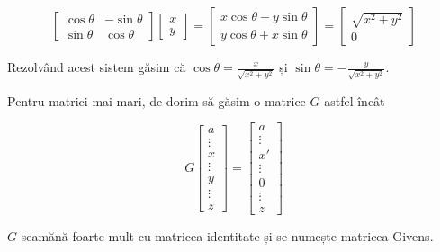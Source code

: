 \documentclass{exam}
\begin{document}
\begin{equation*}
	\begin{bmatrix} \cos \theta & -\sin \theta \\ \sin \theta & \cos \theta \end{bmatrix} \begin{bmatrix} x \\ y \end{bmatrix}
	= \begin{bmatrix} x \cos \theta - y \sin \theta \\ y \cos \theta + x \sin \theta \end{bmatrix}
	= \begin{bmatrix} \sqrt{x^2 + y^2} \\ 0 \end{bmatrix}
\end{equation*}

\par Rezolvând acest sistem găsim că $\cos \theta = \frac{x}{\sqrt{x^2 + y^2}}$ și
$\sin \theta = - \frac{y}{\sqrt{x^2 + y^2}}$.

\par Pentru matrici mai mari, de dorim să găsim o matrice $G$ astfel încât

\begin{equation*}
	G \begin{bmatrix} a \\ \vdots \\ x \\ \vdots \\ y \\ \vdots \\ z \end{bmatrix} = \begin{bmatrix} a \\ \vdots \\ x' \\ \vdots \\ 0 \\ \vdots \\ z \end{bmatrix}
\end{equation*}

\par $G$ seamănă foarte mult cu matricea identitate și se numește matricea Givens.
\end{document}
